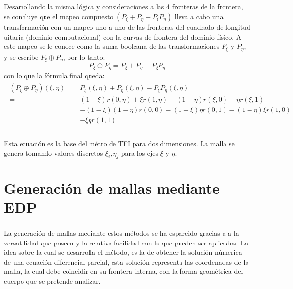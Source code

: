 \documentclass[letterpaper, openright, 12pt]{book}
\begin{document}
			\paragraph*{}
				Desarrollando la misma lógica y consideraciones a las 4 fronteras de la frontera, se concluye que el mapeo compuesto $(P_{\xi} + P_{\eta} - P_{\xi}P_{\eta})$ lleva a cabo una transformación con un mapeo uno  a uno de las fronteras del cuadrado de longitud uitaria (dominio computacional) con la curvas de frontera del dominio físico. A este mapeo se le conoce como la suma booleana de las transformaciones $P_{\xi}$ y $P_{\eta}$, y se escribe $P_{\xi}\oplus P_{\eta}$, por lo tanto:
				\begin{equation}
					P_{\xi}\oplus P_{\eta} = P_{\xi} + P_{\eta} - P_{\xi} P_{\eta}
				\end{equation}
				con lo que la fórmula final queda:
				\begin{align}
					\begin{aligned}
						\left( P_{\xi}\oplus P_{\eta} \right)(\xi, \eta) =& P_{\xi}(\xi, \eta) + P_{\eta}(\xi, \eta) - P_{\xi}P_{\eta}(\xi, \eta) \\
						=& (1 - \xi)r(0, \eta) + \xi r(1, \eta) + (1 - \eta)r(\xi, 0) + \eta r(\xi, 1) \\&- (1-\xi)(1 - \eta)r(0, 0) - (1 - \xi)\eta r(0, 1) - (1- \eta)\xi r(1, 0) \\& - \xi \eta r(1,1)
					\end{aligned}
				\end{align}
			\paragraph*{}
				Esta ecuación es la base del métro de TFI para dos dimensiones. La malla se genera tomando valores discretos $\xi_{i}, \eta_{j}$ para los ejes $\xi$ y $\eta$.
				


%
%
%
%
%

%
%
%
%
%
\chapter{Generación de mallas mediante EDP}
		\paragraph*{}
		La generación de mallas mediante estos métodos se ha esparcido gracias a a la versatilidad que poseen y la relativa facilidad con la que pueden ser aplicados. La idea sobre la cual se desarrolla el método, es la de obtener la solución númerica de una ecuación diferencial parcial, esta solución representa las coordenadas de la malla, la cual debe coincidir en su frontera interna, con la forma geométrica del cuerpo que se pretende analizar.\cite{siladic-grid-generation}
		
\end{document}
